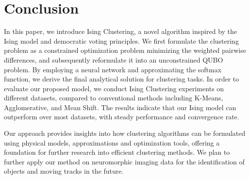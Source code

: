 \documentclass[journal]{IEEEtran}
\begin{document}
\section{Conclusion}

In this paper, we introduce Ising Clustering, a novel algorithm inspired by the Ising model and democratic voting principles. We first formulate the clustering problem as a constrained optimization problem minimizing the weighted pairwise differences, and subsequently reformulate it into an unconstrained QUBO problem.  By employing a neural network and approximating the softmax function, we derive the final analytical solution for clustering tasks. In order to evaluate our proposed model, we conduct Ising Clustering experiments on different datasets, compared to conventional methods including K-Means, Agglomerative, and Mean Shift. The results indicate that our Ising model can outperform over most datasets, with steady performance and convergence rate.

Our approach provides insights into how clustering algorithms can be formulated using physical models, approximations and optimization tools, offering a foundation for further research into efficient clustering methods. We plan to further apply our method on neuromorphic imaging data for the identification of objects and moving tracks in the future. 




\appendices





\end{document}
